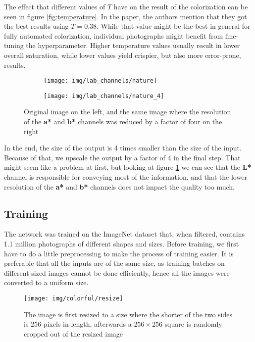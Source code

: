 The effect that different values of $T$ have on the result of the colorization
can be seen in figure \ref{fig:temperature}. In the paper, the authors mention
that they got the best results using $T=0.38$. While that value might be the best
in general for fully automated colorization, individual photographs might benefit
from fine-tuning the hyperparameter. Higher temperature values usually result in 
lower overall saturation, while lower values yield crispier, but also more error-prone, results.

\begin{figure}[!ht]
	\centering
	\begin{subfigure}{.49\textwidth}
		\centering
		\texttt{[image: img/lab\_channels/nature]}
	\end{subfigure}
	\begin{subfigure}{.49\textwidth}
		\centering
		\texttt{[image: img/lab\_channels/nature\_4]}
	\end{subfigure}
    \caption{Original image on the left, and the same image where the resolution of the \textbf{a*} and \textbf{b*} channels was reduced by a factor of four on the right}
	\label{fig:color4}
\end{figure}

In the end, the size of the output is 4 times smaller than the size of the input. 
Because of that, we upscale the output by a factor of 4 in the final step. That might
seem like a problem at first, but looking at figure \ref{fig:color4} we can see
that the \textbf{L*} channel is responsible for conveying most of the information, and
that the lower resolution of the \textbf{a*} and \textbf{b*} channels does not impact
the quality too much.

\subsection{Training}
\label{sec:colorful_training}

The network was trained on the ImageNet dataset that, when filtered, contains
1.1 million photographs of different shapes and sizes. Before training, we first
have to do a little preprocessing to make the process of training easier. It is 
preferable that all the inputs are of the same size, as training batches on 
different-sized images cannot be done efficiently, hence all the images were 
converted to a uniform size. 

\begin{figure}[!ht]
	\centering
	\texttt{[image: img/colorful/resize]}
    \caption{
	The image is first resized to a size where the shorter of the two sides
	is $256$ pixels in length, afterwards a $256\times256$ square is 
	randomly cropped out of the resized image}
	\label{fig:crop}
\end{figure}


